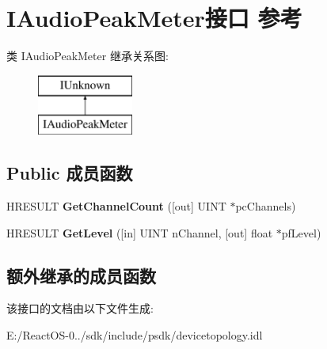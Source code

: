 \hypertarget{interface_i_audio_peak_meter}{}\section{I\+Audio\+Peak\+Meter接口 参考}
\label{interface_i_audio_peak_meter}
类 I\+Audio\+Peak\+Meter 继承关系图\+:\begin{figure}[H]
\begin{center}
\leavevmode
\includegraphics[height=2.000000cm]{interface_i_audio_peak_meter}
\end{center}
\end{figure}
\subsection*{Public 成员函数}
\begin{DoxyCompactItemize}
\item 
\mbox{\label{interface_i_audio_peak_meter_a88fc1e50d6d6c4171feb9ee772f86145}} 
H\+R\+E\+S\+U\+LT {\bfseries Get\+Channel\+Count} (\mbox{[}out\mbox{]} U\+I\+NT $\ast$pc\+Channels)
\item 
\mbox{\label{interface_i_audio_peak_meter_a783bb55fcfa4c3ba398946ef26d017aa}} 
H\+R\+E\+S\+U\+LT {\bfseries Get\+Level} (\mbox{[}in\mbox{]} U\+I\+NT n\+Channel, \mbox{[}out\mbox{]} float $\ast$pf\+Level)
\end{DoxyCompactItemize}
\subsection*{额外继承的成员函数}


该接口的文档由以下文件生成\+:\begin{DoxyCompactItemize}
\item 
E\+:/\+React\+O\+S-\/0../sdk/include/psdk/devicetopology.\+idl\end{DoxyCompactItemize}
